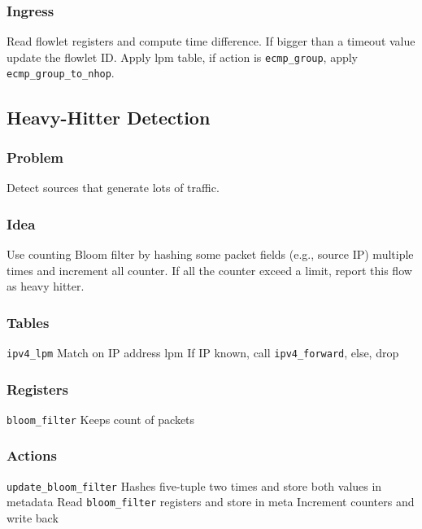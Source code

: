 \documentclass[a4paper, fontsize=8pt, landscape, DIV=1]{scrartcl}
\begin{document}
\begin{multicols*}{4}
  \subsubsection{Ingress} Read flowlet registers and compute time difference. If bigger than 
  a timeout value update the flowlet ID. Apply lpm table, if action is \texttt{ecmp\_group}, apply
  \texttt{ecmp\_group\_to\_nhop}.

  \vfill\null
  \columnbreak
  \subsection{Heavy-Hitter Detection}
  \subsubsection{Problem} Detect sources that generate lots of traffic.

  \subsubsection{Idea} Use counting Bloom filter by hashing some packet fields (e.g., source IP)
  multiple times and increment all counter. If all the counter exceed a limit, report
  this flow as heavy hitter.

  \subsubsection{Tables} 
  \begin{outline}
  \1 \texttt{ipv4\_lpm} Match on IP address lpm
    \2 If IP known, call \texttt{ipv4\_forward}, else, drop
  \end{outline}
  

  \subsubsection{Registers}
  \begin{outline}
  \1 \texttt{bloom\_filter}
    \2 Keeps count of packets
  \end{outline}

  \subsubsection{Actions}
  \begin{outline}
  \1 \texttt{update\_bloom\_filter}
    \2 Hashes five-tuple two times and store both values in metadata
    \2 Read \texttt{bloom\_filter} registers and store in meta
    \2 Increment counters and write back    
  \end{outline}


\end{multicols*}
\end{document}
